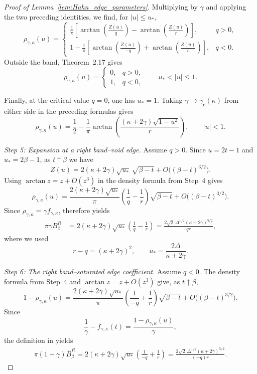 \documentclass[reqno,11pt]{amsart}
\theoremstyle{plain}
\theoremstyle{definition}
\numberwithin{equation}{section}
\begin{document}
\begin{proof}[Proof of Lemma~\ref{lem:Hahn_edge_parameters}]
Multiplying \cite[formulas~(2.77) and~(2.79)]{baik2007discrete}
by $\gamma$ and applying the two preceding identities, we find, for $|u|\leq u_{\ast}$,
\[
\rho_{\gamma,\kappa}(u)
=
\begin{cases}
\displaystyle
\frac1\pi
\left[
\arctan\left(
\frac{Z(u)}{q}
\right)
-
\arctan\left(
\frac{Z(u)}{r}
\right)
\right],
& q>0,
\\[1.4em]
\displaystyle
1-\frac1\pi
\left[
\arctan\left(
\frac{Z(u)}{-q}
\right)
+
\arctan\left(
\frac{Z(u)}{r}
\right)
\right],
& q<0.
\end{cases}
\]
Outside the band, Theorem~2.17 gives
\[
\rho_{\gamma,\kappa}(u)
=
\begin{cases}
0, & q>0,\\
1, & q<0,
\end{cases}
\qquad
u_{\ast}<|u|\leq1.
\]

Finally, at the critical value $q=0$, one has $u_{\ast}=1$.
Taking $\gamma\to\gamma_{\mathrm c}(\kappa)$ from either side in the
preceding formulas gives
\[
\rho_{\gamma,\kappa}(u)
=
\frac12
-
\frac1\pi
\arctan\left(
\frac{
(\kappa+2\gamma)\sqrt{1-u^2}
}{
r
}
\right),
\qquad
|u|<1.
\]

\medskip
\noindent
\emph{Step 5: Expansion at a right band--void edge.}
Assume $q>0$. Since $u=2t-1$ and $u_{\ast}=2\beta-1$, as
$t\uparrow\beta$ we have
\[
Z(u)
=
2(\kappa+2\gamma)\sqrt{u_{\ast}}\,
\sqrt{\beta-t}
+
O\bigl((\beta-t)^{3/2}\bigr).
\]
Using $\arctan z=z+O(z^3)$ in the density formula from Step~4 gives
\[
\rho_{\gamma,\kappa}(u)
=
\frac{
2(\kappa+2\gamma)\sqrt{u_{\ast}}
}{\pi}
\left(
\frac1q-\frac1r
\right)
\sqrt{\beta-t}
+
O\bigl((\beta-t)^{3/2}\bigr).
\]
Since $\rho_{\gamma,\kappa}=\gamma f_{\gamma,\kappa}$,
\cite[formula~(3.16)]{baik2007discrete} therefore yields
\[
\begin{aligned}
\pi\gamma B_\beta^R
&=
2(\kappa+2\gamma)\sqrt{u_{\ast}}
\left(
\frac1q-\frac1r
\right) =
\frac{
2\sqrt{2}\,
\Delta^{1/2}
(\kappa+2\gamma)^{5/2}
}{
qr
},
\end{aligned}
\]
where we used
\[
r-q=(\kappa+2\gamma)^2,
\qquad
u_{\ast}=\frac{2\Delta}{\kappa+2\gamma}.
\]

\medskip
\noindent
\emph{Step 6: The right band--saturated edge coefficient.}
Assume $q<0$. The density formula from Step~4 and
$\arctan z=z+O(z^3)$ give, as $t\uparrow\beta$,
\[
1-\rho_{\gamma,\kappa}(u)
=
\frac{
2(\kappa+2\gamma)\sqrt{u_{\ast}}
}{\pi}
\left(
\frac1{-q}+\frac1r
\right)
\sqrt{\beta-t}
+
O\bigl((\beta-t)^{3/2}\bigr).
\]
Since
\[
\frac1\gamma-f_{\gamma,\kappa}(t)
=
\frac{1-\rho_{\gamma,\kappa}(u)}{\gamma},
\]
the definition in \cite[formula~(3.18)]{baik2007discrete} yields
\[
\begin{aligned}
\pi(1-\gamma)\overline B_\beta^R =
2(\kappa+2\gamma)\sqrt{u_{\ast}}
\left(
\frac1{-q}+\frac1r
\right) =
\frac{
2\sqrt{2}\,
\Delta^{1/2}
(\kappa+2\gamma)^{5/2}
}{
(-q)r
}.
\end{aligned}
\]


\end{proof}
\end{document}

